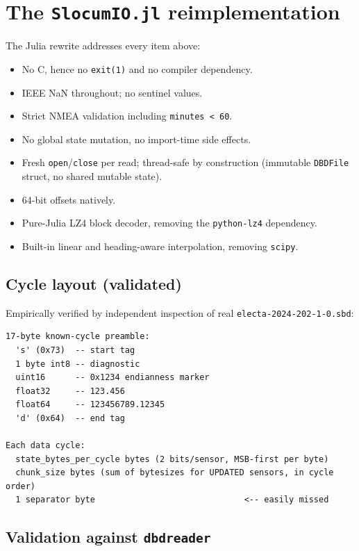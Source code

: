 \documentclass[11pt]{article}
\begin{document}
\section{The \texttt{SlocumIO.jl} reimplementation}

The Julia rewrite addresses every item above:

\begin{itemize}[leftmargin=*,topsep=1pt,itemsep=0pt]
  \item No C, hence no \texttt{exit(1)} and no compiler dependency.
  \item IEEE NaN throughout; no sentinel values.
  \item Strict NMEA validation including \texttt{minutes < 60}.
  \item No global state mutation, no import-time side effects.
  \item Fresh \texttt{open}/\texttt{close} per read; thread-safe by construction
        (immutable \texttt{DBDFile} struct, no shared mutable state).
  \item 64-bit offsets natively.
  \item Pure-Julia LZ4 block decoder, removing the \texttt{python-lz4} dependency.
  \item Built-in linear and heading-aware interpolation, removing \texttt{scipy}.
\end{itemize}

\subsection{Cycle layout (validated)}

Empirically verified by independent inspection of real \texttt{electa-2024-202-1-0.sbd}:

\begin{lstlisting}
17-byte known-cycle preamble:
  's' (0x73)  -- start tag
  1 byte int8 -- diagnostic
  uint16      -- 0x1234 endianness marker
  float32     -- 123.456
  float64     -- 123456789.12345
  'd' (0x64)  -- end tag

Each data cycle:
  state_bytes_per_cycle bytes (2 bits/sensor, MSB-first per byte)
  chunk_size bytes (sum of bytesizes for UPDATED sensors, in cycle order)
  1 separator byte                              <-- easily missed
\end{lstlisting}

\subsection{Validation against \texttt{dbdreader}}
\end{document}

